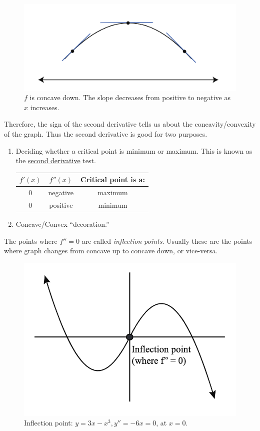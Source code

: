 \begin{figure}[ht!]
	\centering
	\includegraphics[scale=0.65]{./images/lecture_8_figure_2.png}
	\caption{$f$ is concave down. The slope decreases from positive to negative as $x$ increases.}
\end{figure}


Therefore, the sign of the second derivative tells us about the concavity/convexity of the graph.
Thus the second derivative is good for two purposes.

\begin{enumerate}
    \item Deciding whether a critical point is minimum or maximum. This is known as the \underline{second derivative} test.
    \begin{center}
    \begin{tabular}{ |c|c|c| }
        \hline
        $f'(x)$ & $f''(x)$ & Critical point is a: \\ 
        \hline
        $0$ & negative & maximum \\  
        \hline
        $0$ & positive & minimum \\ 
        \hline
    \end{tabular}
    \end{center}
    \item Concave/Convex ``decoration.''
\end{enumerate}

The points where $f'' = 0$ are called \textit{inflection points}. 
Usually these are the points where graph changes from concave up to concave down, or vice-versa.

\begin{figure}[ht!]
	\centering
	\includegraphics[scale=0.65]{./images/lecture_8_figure_3.png}
	\caption{Inflection point: $y = 3x - x^3, y'' = -6x = 0$, at $x = 0$.}
\end{figure}